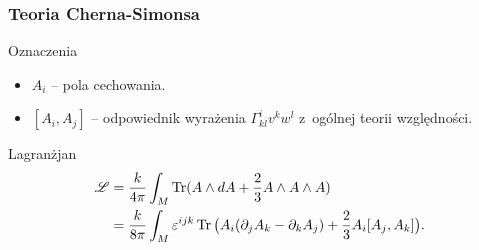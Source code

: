 \documentclass[10pt,t]{beamer}
\begin{document}
\begin{frame}
  \frametitle{Teoria Cherna-Simonsa}


  Oznaczenia
  \begin{itemize}

  \item $A_{ i }$ -- pola cechowania.

  \item $[ A_{ i }, A_{ j } ]$ -- odpowiednik wyrażenia
    $\Gamma^{ i }_{ k l } v^{ k } w^{ l }$ z~ogólnej teorii
    względności.

  \end{itemize}


  Lagranżjan
  \begin{equation}
    \label{eq:Ogolna-wspolzmienniczosc-03}
    \begin{split}
      \mathcal{L}
      &= \frac{ k }{ 4 \pi } \int_{ M } \operatorname{Tr} ( A \wedge dA
        + \frac{ 2 }{ 3 } A \wedge A \wedge A ) \\
      &= \frac{ k }{ 8 \pi } \int_{ M } \varepsilon^{ i j k } \operatorname{Tr} \big( A_{ i } ( \partial_{ j } A_{ k }
        - \partial_{ k } A_{ j } ) + \frac{ 2 }{ 3 } A_{ i } [ A_{ j }, A_{ k } ] \big).
      \end{split}
    \end{equation}

\end{frame}










\appendix















\begin{frame}


  

  {}

\end{frame}











\end{document}
